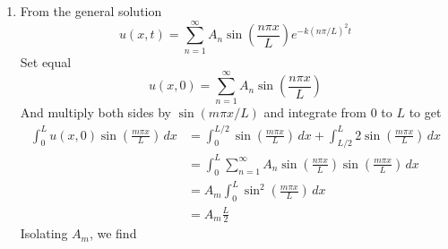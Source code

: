 \documentclass[a4paper]{article}
\begin{document}
\begin{enumerate}[label=(\alph*)]
\begin{align*}
		 & = -\frac{2}{L}\!\left[ \frac{L}{\!\left( m + 3 \right)\pi}\cos\!\left(\frac{\!\left( m + 3 \right)\pi x}{L}\right)\Big|^{L}_{0} + \frac{L}{\!\left( m - 3 \right)\pi}\cos\!\left(\frac{\!\left( m - 3 \right)\pi x}{L}\right)\Big|^{L}_{0} \right] \\
		 & = \begin{cases}
			 \displaystyle{-\frac{2}{L}\!\left[ -\frac{2L}{\!\left( m + 3 \right)\pi} - \frac{2L}{\!\left( m - 3 \right)\pi} \right]}, & m \text{ even} \\
		 	0, & m \text{ odd}
		     \end{cases} \\
		 & = \begin{cases}
			 \displaystyle{\frac{8m}{\!\left( m + 3 \right)\!\left( m - 3 \right)\pi}}, & m \text{ even} \\
		 	0, & m \text{ odd}
		 \end{cases}
	\end{align*}
	Rewriting as 
	\[
		A_{n} = \frac{16n}{\!\left( 2n + 3 \right)\!\left( 2n - 3 \right)\pi} 
	\]
	we have temperature distribution
	\[
		u \!\left( x,t \right) = \sum^{\infty}_{n=1} \frac{16n}{\!\left( 2n + 3 \right)\!\left( 2n - 3 \right)\pi}\sin\!\left(\frac{2n \pi x}{L}\right)e^{-k \!\left( 2n \pi / L \right)^{2}t} 
	\]
	Observe that by ensuring that we sum only over even indices, \textit{every} index throughout the expression must be scaled by a factor of two.
	\item From the general solution
	\[
		u \!\left( x,t \right) = \sum^{\infty}_{n=1} A_{n}\sin\!\left(\frac{n \pi x}{L}\right)e^{-k \!\left( n \pi / L \right)^{2}t} 
	\]
	Set equal
	\[
		u \!\left( x,0 \right) = \sum^{\infty}_{n=1} A_{n}\sin\!\left(\frac{n \pi x}{L}\right) 
	\]
	And multiply both sides by \( \sin\!\left(m \pi x / L\right) \) and integrate from \( 0 \) to \( L \) to get
	\begin{align*}
		\int^{L}_{0} u \!\left( x,0 \right)\sin\!\left(\frac{m \pi x}{L}\right) \, dx & = \int^{L/2}_{0} \sin\!\left(\frac{m \pi x}{L}\right) \, dx + \int^{L}_{L/2} 2 \sin\!\left(\frac{m \pi x}{L}\right) \, dx \\
											      & = \int^{L}_{0} \sum^{\infty}_{n=1} A_{n}\sin\!\left(\frac{n \pi x}{L}\right)\sin\!\left(\frac{m \pi x}{L}\right) \, dx \\
											      & = A_{m}\int^{L}_{0} \sin^{2}\!\left(\frac{m \pi x}{L}\right) \, dx \\
											      & = A_{m}\frac{L}{2}
	\end{align*}
	Isolating \( A_{m} \), we find

\end{enumerate}
\end{document}
